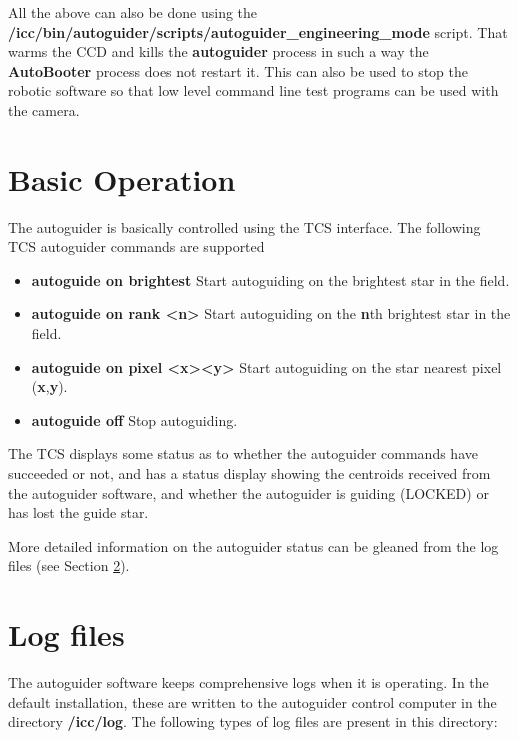 \documentclass[10pt,a4paper]{article}
\begin{document}
All the above can also be done using the {\bf /icc/bin/autoguider/scripts/autoguider\_engineering\_mode} script. That
warms the CCD and kills the {\bf autoguider} process in such a way the {\bf AutoBooter} process does not restart it. This can also be used to stop the robotic software so that low level command line test programs can be used with the camera.

\section{Basic Operation}

The autoguider is basically controlled using the TCS interface. The following TCS autoguider commands are supported
\begin{itemize}
\item {\bf autoguide on brightest} Start autoguiding on the brightest star in the field.
\item {\bf autoguide on rank \textless n\textgreater} Start autoguiding on the {\bf n}th brightest star in the field.
\item {\bf autoguide on pixel \textless x\textgreater \textless y\textgreater} Start autoguiding on the  star nearest pixel ({\bf x},{\bf y}).
\item {\bf autoguide off} Stop autoguiding.
\end{itemize}

The TCS displays some status as to whether the autoguider commands have succeeded or not, and has a status display showing the centroids received from the autoguider software, and whether the autoguider is guiding (LOCKED) or has lost the guide star.

More detailed information on the autoguider status can be gleaned from the log files (see Section \ref{sec:logfiles}).

\section{Log files}
\label{sec:logfiles}

The autoguider software keeps comprehensive logs when it is operating. In the default installation, these are written to the autoguider control computer in the directory {\bf /icc/log}. The following types of log files are present in this directory:
\end{document}
